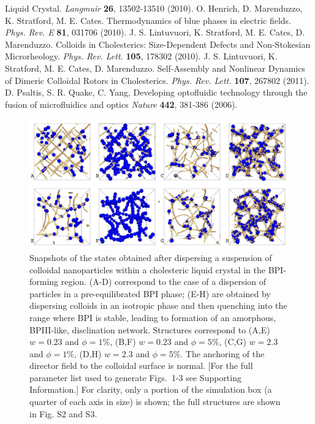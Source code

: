 \documentclass[12pt]{article}
\begin{document}
\begin{thebibliography}{99}
 Liquid Crystal. {\it Langmuir} {\bf 26}, 13502-13510 (2010).
  O. Henrich, D. Marenduzzo, K. Stratford, 
M. E. Cates. Thermodynamics of blue phases in electric fields.
{\it Phys. Rev. E} {\bf 81}, 031706 (2010).
 J. S. Lintuvuori, K. Stratford, M. E. Cates,
D. Marenduzzo.   Colloids in Cholesterics: Size-Dependent Defects and Non-Stokesian Microrheology. {\it Phys. Rev. Lett.} {\bf 105}, 178302 (2010).
  J. S. Lintuvuori, K. Stratford, M. E. Cates,
D. Marenduzzo. 
Self-Assembly and Nonlinear Dynamics of Dimeric Colloidal Rotors in 
Cholesterics. {\it Phys. Rev. Lett.} {\bf 107}, 267802 (2011).
 D. Psaltis, S. R. Quake, C. Yang, Developing optofluidic technology through the fusion of microfluidics and optics {\it Nature} {\bf 442}, 381-386 (2006).

\end{thebibliography}

\newpage

\begin{figure}

\centerline{\includegraphics[width=\textwidth]{text-fig1.jpg}}
\caption{Snapshots of the states obtained after dispersing
a suspension of colloidal nanoparticles within a cholesteric liquid
crystal in the BPI-forming region. (A-D) correspond to the case
of a dispersion of particles in a pre-equilibrated BPI phase;
(E-H) are obtained by dispersing colloids in an isotropic
phase and then quenching into the range where BPI is stable, leading to formation of an amorphous, BPIII-like, disclination network.
Structures correspond
to (A,E) $w=0.23$ and $\phi=1\%$, 
(B,F) $w=0.23$ and $\phi=5\%$, 
(C,G) $w=2.3$ and $\phi=1\%$,
(D,H) $w=2.3$ and $\phi=5\%$.
The anchoring of the director field to the colloidal surface is normal.
[For the full parameter list used to generate Figs.~1-3 see Supporting Information.] For clarity, only a portion of the simulation box (a quarter of
each axis in size) is shown; the full structures are shown in Fig. S2 and S3.}
\end{figure}
\end{document}
